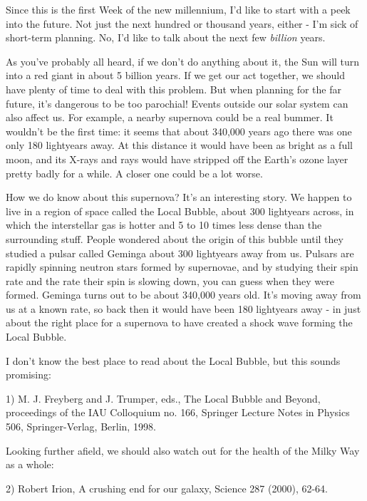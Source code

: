 

Since this is the first Week of the new millennium, I'd like to start
with a peek into the future.  Not just the next hundred or thousand
years, either - I'm sick of short-term planning.  No, I'd like to talk
about the next few \emph{billion} years.  
  
As you've probably all heard, if we don't do anything about it, the Sun
will turn into a red giant in about 5 billion years.  If we get our act 
together, we should have plenty of time to deal with this problem.  But 
when planning for the far future, it's dangerous to be too parochial!  
Events outside our solar system can also affect us.  For example, a 
nearby supernova could be a real bummer.   It wouldn't be the first time:
it seems that about 340,000 years ago there was one only 180 lightyears away.  
At this distance it would have been as bright as a full moon, and its 
X-rays and \gamma  rays would have stripped off the Earth's ozone layer 
pretty badly for a while.  A closer one could be a lot worse.  

How we do know about this supernova?  It's an interesting story.   We
happen to live in a region of space called the Local Bubble, about 300 
lightyears across, in which the interstellar gas is hotter and 5 to 10
times less dense than the surrounding stuff.  People wondered about the 
origin of this bubble until they studied a pulsar called Geminga about 
300 lightyears away from us.  Pulsars are rapidly spinning neutron
stars formed by supernovae, and by studying their spin rate and the
rate their spin is slowing down, you can guess when they were formed. 
Geminga turns out to be about 340,000 years old.  It's moving away from
us at a known rate, so back then it would have been 180 lightyears away - 
in just about the right place for a supernova to have created a shock
wave forming the Local Bubble.  

I don't know the best place to read about the Local Bubble, but this
sounds promising:

1) M. J. Freyberg and J. Trumper, eds., The Local Bubble and Beyond, 
proceedings of the IAU Colloquium no. 166, Springer Lecture Notes in 
Physics 506, Springer-Verlag, Berlin, 1998.

Looking further afield, we should also watch out for the health of
the Milky Way as a whole:

2) Robert Irion, A crushing end for our galaxy, Science 287 (2000),
62-64. 

